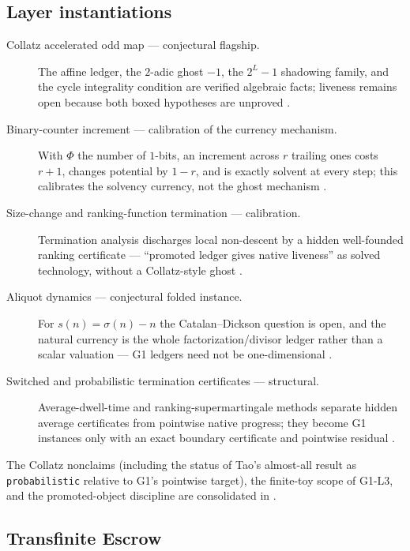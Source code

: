 \documentclass[11pt]{article}
\newcommand{\lawGTwo}{Transfinite Escrow}
\theoremstyle{definition}
\begin{document}
\subsection*{Layer instantiations}\label{layer-inst:G1}
\begin{description}
  \item[Collatz accelerated odd map --- conjectural flagship.] The affine ledger, the $2$-adic ghost
    $-1$, the $2^{L}-1$ shadowing family, and the cycle integrality condition are verified algebraic
    facts; liveness remains open because both boxed hypotheses are unproved
    \citep{Lagarias1985,Lagarias2010,Tao2019Collatz}.
  \item[Binary-counter increment --- calibration of the currency mechanism.] With $\Phi$ the number of
    $1$-bits, an increment across $r$ trailing ones costs $r + 1$, changes potential by $1 - r$, and
    is exactly solvent at every step; this calibrates the solvency currency, not the ghost mechanism
    \citep{Tarjan1985,CormenEtAl}.
  \item[Size-change and ranking-function termination --- calibration.] Termination analysis discharges
    local non-descent by a hidden well-founded ranking certificate --- ``promoted ledger gives native
    liveness'' as solved technology, without a Collatz-style ghost \citep{LeeJonesBenAmram2001}.
  \item[Aliquot dynamics --- conjectural folded instance.] For $s(n) = \sigma(n) - n$ the
    Catalan--Dickson question is open, and the natural currency is the whole factorization/divisor
    ledger rather than a scalar valuation --- G1 ledgers need not be one-dimensional
    \citep{GuySelfridge1975,GuyUnsolved}.
  \item[Switched and probabilistic termination certificates --- structural.] Average-dwell-time and
    ranking-supermartingale methods separate hidden average certificates from pointwise native
    progress; they become G1 instances only with an exact boundary certificate and pointwise residual
    \citep{Liberzon2003,AgrawalChatterjeeNovotny2017}.
\end{description}

The Collatz nonclaims (including the status of Tao's almost-all result as \texttt{probabilistic}
relative to G1's pointwise target), the finite-toy scope of G1-L3, and the promoted-object discipline
are consolidated in .

\subsection{\lawGTwo}\label{sec:clusterA:g2}
\end{document}
